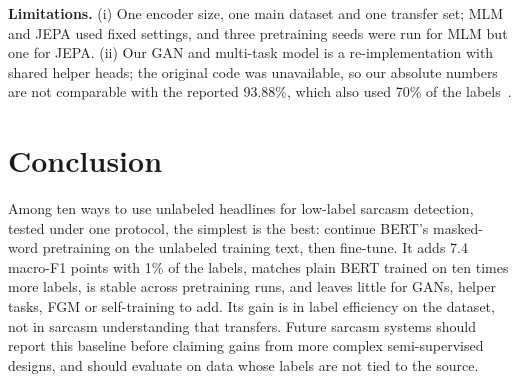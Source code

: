 \documentclass[conference]{IEEEtran}
\begin{document}
\textbf{Limitations.} (i) One encoder size, one main dataset and one transfer set; MLM and JEPA used fixed settings, and three pretraining seeds were run for MLM but one for JEPA. (ii) Our GAN and multi-task model is a re-implementation with shared helper heads; the original code was unavailable, so our absolute numbers are not comparable with the reported 93.88\%, which also used 70\% of the labels~\cite{irfan2025seed}. %

\section{Conclusion}

Among ten ways to use unlabeled headlines for low-label sarcasm detection, tested under one protocol, the simplest is the best: continue BERT's masked-word pretraining on the unlabeled training text, then fine-tune. It adds 7.4 macro-F1 points with 1\% of the labels, matches plain BERT trained on ten times more labels, is stable across pretraining runs, and leaves little for GANs, helper tasks, FGM or self-training to add. Its gain is in label efficiency on the dataset, not in sarcasm understanding that transfers. Future sarcasm systems should report this baseline before claiming gains from more complex semi-supervised designs, and should evaluate on data whose labels are not tied to the source.



\end{document}
